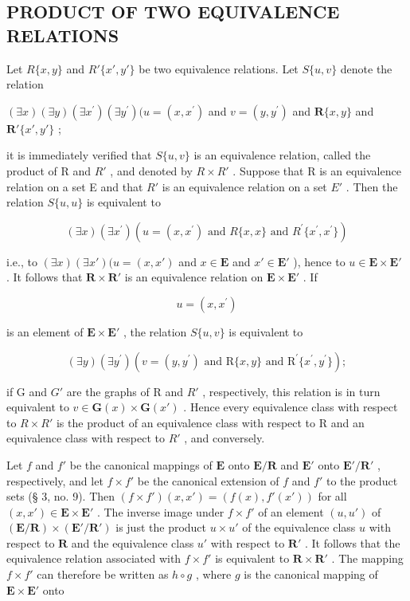 \subsection{PRODUCT OF TWO EQUIVALENCE RELATIONS}

Let \(R\{x, y\}\) and \(R'\{x', y'\}\) be two equivalence relations. Let \(S\{u, v\}\) denote the relation

\((\exists x)(\exists y)(\exists x^{\prime})(\exists y^{\prime})(u = (x,x^{\prime})\) and \(v = (y,y^{\prime})\) and \(\mathbf{R}\{x,y\}\) and \(\mathbf{R}'\{x',y'\}\) ;

it is immediately verified that \(S\{u, v\}\) is an equivalence relation, called the product of R and \(R'\) , and denoted by \(R \times R'\) . Suppose that R is an equivalence relation on a set E and that \(R'\) is an equivalence relation on a set \(E'\) . Then the relation \(S\{u, u\}\) is equivalent to

\[
(\exists x) (\exists x ^ {\prime}) (u = (x, x ^ {\prime}) \text { and } R \{x, x \} \text { and } R ^ {\prime} \{x ^ {\prime}, x ^ {\prime} \})
\]

i.e., to \((\exists x)(\exists x')(u = (x, x')\) and \(x \in \mathbf{E}\) and \(x' \in \mathbf{E}'\) ), hence to \(u \in \mathbf{E} \times \mathbf{E}'\) . It follows that \(\mathbf{R} \times \mathbf{R}'\) is an equivalence relation on \(\mathbf{E} \times \mathbf{E}'\) . If

\[
u = (x, x ^ {\prime})
\]

is an element of \(\mathbf{E} \times \mathbf{E}'\) , the relation \(S\{u, v\}\) is equivalent to

\[
(\exists y) (\exists y ^ {\prime}) (v = (y, y ^ {\prime}) \text {   and   } \mathrm{R} \{x, y \} \text {   and   } \mathrm{R} ^ {\prime} \{x ^ {\prime}, y ^ {\prime} \});
\]

if G and \(G'\) are the graphs of R and \(R'\) , respectively, this relation is in turn equivalent to \(v \in \mathbf{G}(x) \times \mathbf{G}(x')\) . Hence every equivalence class with respect to \(R \times R'\) is the product of an equivalence class with respect to R and an equivalence class with respect to \(R'\) , and conversely.

Let \(f\) and \(f'\) be the canonical mappings of \(\mathbf{E}\) onto \(\mathbf{E}/\mathbf{R}\) and \(\mathbf{E}'\) onto \(\mathbf{E}'/\mathbf{R}'\) , respectively, and let \(f \times f'\) be the canonical extension of \(f\) and \(f'\) to the product sets (§ 3, no. 9). Then \((f \times f')(x, x') = (f(x), f'(x'))\) for all \((x, x') \in \mathbf{E} \times \mathbf{E}'\) . The inverse image under \(f \times f'\) of an element \((u, u')\) of \((\mathbf{E}/\mathbf{R}) \times (\mathbf{E}'/\mathbf{R}')\) is just the product \(u \times u'\) of the equivalence class \(u\) with respect to \(\mathbf{R}\) and the equivalence class \(u'\) with respect to \(\mathbf{R}'\) . It follows that the equivalence relation associated with \(f \times f'\) is equivalent to \(\mathbf{R} \times \mathbf{R}'\) . The mapping \(f \times f'\) can therefore be written as \(h \circ g\) , where \(g\) is the canonical mapping of \(\mathbf{E} \times \mathbf{E}'\) onto


